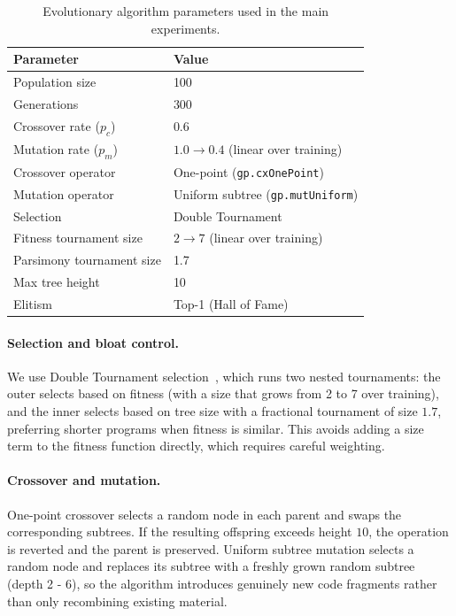 \documentclass[runningheads]{llncs}
\begin{document}
\begin{table}[htbp]
\caption{Evolutionary algorithm parameters used in the main experiments.}
\vspace{-0.2cm}
\label{tab:params}
\centering
\begin{tabular}{ll}
\toprule
\textbf{Parameter} & \textbf{Value} \\
\midrule
Population size & 100 \\
Generations & 300 \\
Crossover rate ($p_c$) & 0.6 \\
Mutation rate ($p_m$) & $1.0 \to 0.4$ (linear over training) \\
Crossover operator & One-point (\texttt{gp.cxOnePoint}) \\
Mutation operator & Uniform subtree (\texttt{gp.mutUniform}) \\
Selection & Double Tournament \\
\quad Fitness tournament size & $2 \to 7$ (linear over training) \\
\quad Parsimony tournament size & 1.7 \\
Max tree height & 10 \\
Elitism & Top-1 (Hall of Fame) \\
\bottomrule
\end{tabular}
\end{table}

\paragraph{Selection and bloat control.}
We use Double Tournament selection~\cite{luke2006bloat}, which runs two nested tournaments: the outer selects based on fitness (with a size that grows from 2 to 7 over training), and the inner selects based on tree size with a fractional tournament of size $1.7$, preferring shorter programs when fitness is similar. This avoids adding a size term to the fitness function directly, which requires careful weighting.

\paragraph{Crossover and mutation.}
One-point crossover selects a random node in each parent and swaps the corresponding subtrees. If the resulting offspring exceeds height $10$, the operation is reverted and the parent is preserved. Uniform subtree mutation selects a random node and replaces its subtree with a freshly grown random subtree (depth 2 - 6), so the algorithm introduces genuinely new code fragments rather than only recombining existing material.
\end{document}

